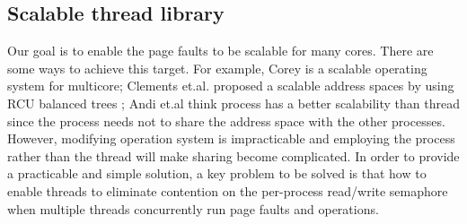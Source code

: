 %
%
%
%
%
%
%
%
%

\subsection{Scalable thread library}

Our goal is to enable the page faults to be scalable for many cores.
There are some ways to achieve this target. 
For example, Corey\cite{boyd2008corey} is a scalable operating system for multicore;
Clements et.al. proposed a scalable address spaces by using RCU balanced trees \cite{Clements2012Scalable};
Andi et.al think process has a better scalability than thread since the process needs not to share the address space with the other processes\cite{Andi2009lmulticore}.
However, modifying operation system is impracticable and employing the process rather than the thread will make sharing become complicated. 
In order to provide a practicable and simple solution, a key problem to be solved is that how to enable threads to eliminate contention on the per-process read/write semaphore when multiple threads concurrently run page faults and  operations.



